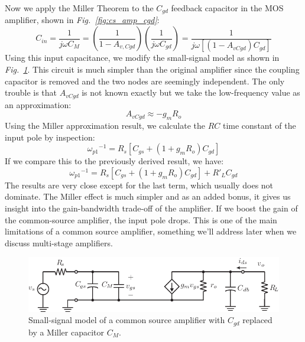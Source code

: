 Now we apply the Miller Theorem to the $C_{gd}$ feedback capacitor in the MOS amplifier, shown in \emph{Fig.~\ref{fig:cs_amp_cgd}}:  
    \begin{equation}
        {C_{in}} = \frac{1}{{j\omega {C_{M}}}} = \left( {\frac{1}{{1 - {A_{v,Cgd}}}}} \right)\left( {\frac{1}{{j\omega {C_{gd}}}}} \right) = \frac{1}{{j\omega \left[ {\left( {1 - {A_{vCgd}}} \right){C_{gd}}} \right]}}
    \end{equation}
Using this input capacitance, we modify the small-signal model as shown in \emph{Fig.~\ref{fig:cs_amp_ac_caps_miller}}.  This circuit is much simpler than the original amplifier since the coupling capacitor is removed and the two nodes are seemingly independent.   The only trouble is that $A_{vCgd}$ is not known exactly but we take the low-frequency value as an approximation:
    \begin{equation}
        A_{vCgd} \approx -g_m R_{o}
    \end{equation}
Using the Miller approximation result, we calculate the $RC$ time constant of the input pole by inspection:
    \begin{equation}
        {\omega _{p1}}^{ - 1} = {R_s}\left[ {{C_{gs}} + \left( {1 + {g_m}{{R}_{o}}} \right){C_{gd}}} \right]
    \end{equation}
If we compare this to the previously derived result, we have:
    \begin{equation} 
        {\omega _{p1}}^{ - 1} = {R_s}\left[ {{C_{gs}} + \left( {1 + {g_m}{{R}_{o}}} \right){C_{gd}}} \right] + {R'_{L}}{C_{gd}}
    \end{equation}
The results are very close except for the last term, which usually does not dominate.  The Miller effect is much simpler and as an added bonus, it gives us insight into the  gain-bandwidth trade-off of the amplifier.  If we boost the gain of the common-source amplifier, the input pole drops.  This is one of the main limitations of a common source amplifier, something we'll address later when we discuss multi-stage amplifiers.
\begin{figure}[tb]
\centering
\includegraphics[scale=1]{cs_amp_ac_caps_miller}
\caption{Small-signal model of a common source amplifier with $C_{gd}$ replaced by a Miller capacitor $C_M$.}
\label{fig:cs_amp_ac_caps_miller}
\end{figure}
